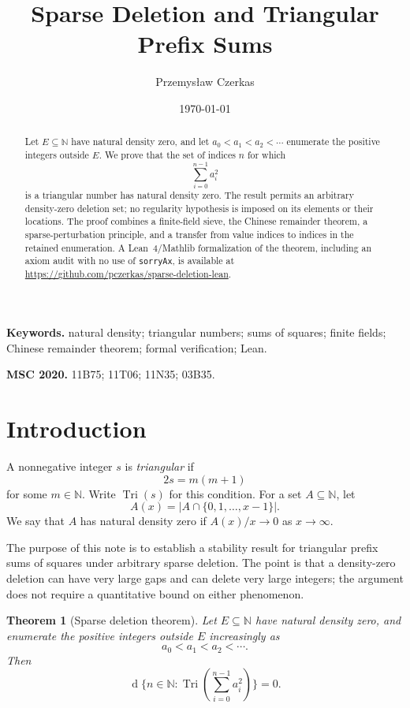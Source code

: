 \documentclass[11pt]{article}
\title{Sparse Deletion and Triangular Prefix Sums}
\author{Przemys\l aw Czerkas}
\date{\today}
\newtheorem{theorem}{Theorem}
\theoremstyle{definition}
\theoremstyle{remark}
\newcommand{\N}{\mathbb{N}}
\newcommand{\card}[1]{\lvert #1\rvert}
\newcommand{\Tri}{\operatorname{Tri}}
\newcommand{\dens}{\operatorname{d}}
\begin{document}
\maketitle

\begin{abstract}
Let $E\subseteq\N$ have natural density zero, and let
$a_0<a_1<a_2<\cdots$ enumerate the positive integers outside $E$.
We prove that the set of indices $n$ for which
\[
  \sum_{i=0}^{n-1} a_i^2
\]
is a triangular number has natural density zero.  The result permits an
arbitrary density-zero deletion set; no regularity hypothesis is imposed on
its elements or their locations.  The proof combines a finite-field sieve,
the Chinese remainder theorem, a sparse-perturbation principle, and a transfer
from value indices to indices in the retained enumeration.  A Lean~4/Mathlib
formalization of the theorem, including an axiom audit with no use of
\texttt{sorryAx}, is available at
\url{https://github.com/pczerkas/sparse-deletion-lean}.
\end{abstract}

\noindent\textbf{Keywords.} natural density; triangular numbers; sums of
squares; finite fields; Chinese remainder theorem; formal verification; Lean.

\noindent\textbf{MSC 2020.} 11B75; 11T06; 11N35; 03B35.

\section{Introduction}

A nonnegative integer $s$ is \emph{triangular} if
\[
  2s=m(m+1)
\]
for some $m\in\N$.  Write $\Tri(s)$ for this condition.  For a set
$A\subseteq\N$, let
\[
  A(x)=\card{A\cap\{0,1,\ldots,x-1\}}.
\]
We say that $A$ has natural density zero if $A(x)/x\to0$ as $x\to\infty$.

The purpose of this note is to establish a stability result for triangular
prefix sums of squares under arbitrary sparse deletion.  The point is that a
density-zero deletion can have very large gaps and can delete very large
integers; the argument does not require a quantitative bound on either
phenomenon.

\begin{theorem}[Sparse deletion theorem]\label{thm:main}
Let $E\subseteq\N$ have natural density zero, and enumerate the positive
integers outside $E$ increasingly as
\[
  a_0<a_1<a_2<\cdots.
\]
Then
\[
  \dens\biggl\{n\in\N:
    \Tri\!\left(\sum_{i=0}^{n-1}a_i^2\right)\biggr\}=0.
\]
\end{theorem}
\end{document}
